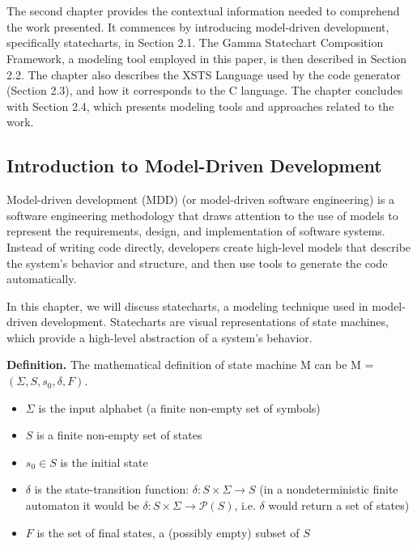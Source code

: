 
\chapter{\hatter}

The second chapter provides the contextual information needed to comprehend the work presented. It commences by introducing model-driven development, specifically statecharts, in Section 2.1. The Gamma Statechart Composition Framework, a modeling tool employed in this paper, is then described in Section 2.2. The chapter also describes the XSTS Language used by the code generator (Section 2.3), and how it corresponds to the C language. The chapter concludes with Section 2.4, which presents modeling tools and approaches related to the work.

\section{Introduction to Model-Driven Development}

Model-driven development (MDD) (or model-driven software engineering) is a software engineering methodology that draws attention to the use of models to represent the requirements, design, and implementation of software systems. Instead of writing code directly, developers create high-level models that describe the system's behavior and structure, and then use tools to generate the code automatically.

In this chapter, we will discuss statecharts, a modeling technique used in model-driven development. Statecharts are visual representations of state machines, which provide a high-level abstraction of a system's behavior.

\textbf{Definition.} The mathematical definition of state machine M can be M = $(\Sigma, S, s_0, \delta, F)$.

\begin{itemize}
	\item $\Sigma$ is the input alphabet (a finite non-empty set of symbols)
	\item $S$ is a finite non-empty set of states
	\item $s_0 \in S$ is the initial state
	\item $\delta$ is the state-transition function: $\delta:S \times \Sigma \rightarrow S$ (in a nondeterministic finite automaton it would be $\delta:S \times \Sigma \rightarrow \mathcal{P}(S)$, i.e. $\delta$ would return a set of states)
	\item $F$ is the set of final states, a (possibly empty) subset of $S$
\end{itemize}

